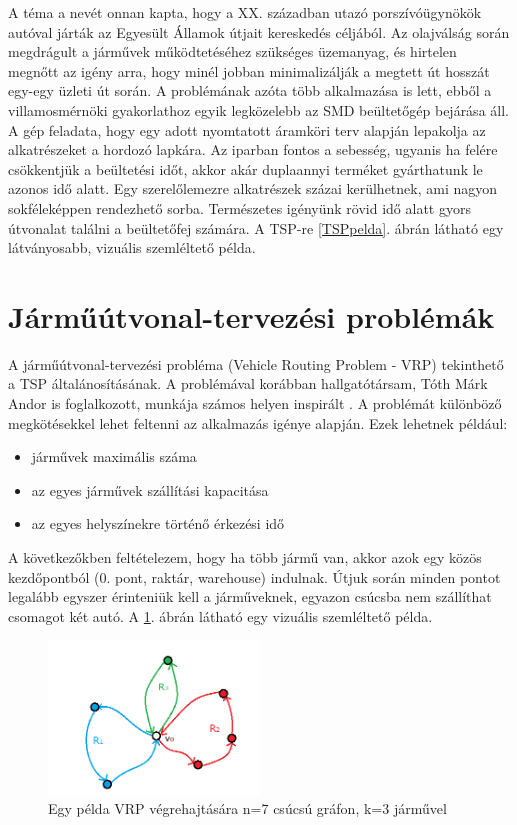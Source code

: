 A téma a nevét onnan kapta, hogy a XX. században utazó porszívóügynökök autóval járták az Egyesült Államok útjait kereskedés céljából. Az olajválság során megdrágult a járművek működtetéséhez szükséges üzemanyag, és hirtelen megnőtt az igény arra, hogy minél jobban minimalizálják a megtett út hosszát egy-egy üzleti út során. A problémának azóta több alkalmazása is lett, ebből a villamosmérnöki gyakorlathoz egyik legközelebb az SMD beültetőgép bejárása áll. A gép feladata, hogy egy adott nyomtatott áramköri terv alapján lepakolja az alkatrészeket a hordozó lapkára. Az iparban fontos a sebesség, ugyanis ha felére csökkentjük a beültetési időt, akkor akár duplaannyi terméket gyárthatunk le azonos idő alatt. Egy szerelőlemezre alkatrészek százai kerülhetnek, ami nagyon sokféleképpen rendezhető sorba. Természetes igényünk  rövid idő alatt gyors útvonalat találni a beültetőfej számára. A TSP-re \ref{TSPpelda}. ábrán látható egy látványosabb, vizuális szemléltető példa.

\section{Járműútvonal-tervezési problémák \label{VRPsection}}
A járműútvonal-tervezési probléma (Vehicle Routing Problem - VRP) tekinthető a TSP általánosításának. A problémával korábban hallgatótársam, Tóth Márk Andor is foglalkozott, munkája számos helyen inspirált \cite{alg_optim}. A problémát különböző megkötésekkel lehet feltenni az alkalmazás igénye alapján. Ezek lehetnek például:
\begin{itemize}
	\item járművek maximális száma
	\item az egyes járművek szállítási kapacitása
	\item az egyes helyszínekre történő érkezési idő
\end{itemize}

A következőkben feltételezem, hogy ha több jármű van, akkor azok egy közös kezdőpontból (0. pont, raktár, warehouse) indulnak. Útjuk során minden pontot legalább egyszer érinteniük kell a járműveknek, egyazon csúcsba nem szállíthat csomagot két autó. A \ref{VRPpelda}. ábrán látható egy vizuális szemléltető példa.

\begin{figure}[ht!]
	\centering
	\includegraphics[width=0.5\textwidth]{figures/VRP_Szoveg_nelkul.png}
	\caption{Egy példa VRP végrehajtására n=7 csúcsú gráfon, k=3 járművel \label{VRPpelda} }
\end{figure}


